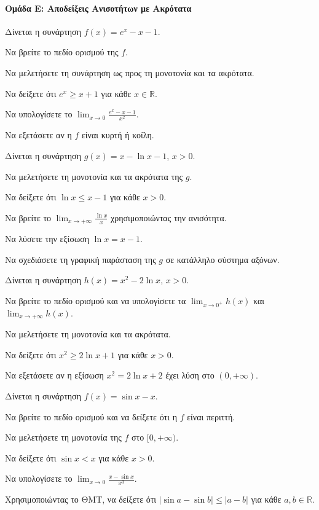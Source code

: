 \documentclass[11pt,a4paper,modern]{FFExercises}
\begin{document}
\paragraph{Ομάδα Ε: Αποδείξεις Ανισοτήτων με Ακρότατα}

\askhsh
Δίνεται η συνάρτηση $f(x) = e^x - x - 1$.
\begin{alist}
    \item Να βρείτε το πεδίο ορισμού της $f$.
    \item Να μελετήσετε τη συνάρτηση ως προς τη μονοτονία και τα ακρότατα.
    \item Να δείξετε ότι $e^x \ge x + 1$ για κάθε $x \in \mathbb{R}$.
    \item Να υπολογίσετε το $\displaystyle\lim_{x \to 0} \frac{e^x - x - 1}{x^2}$.
    \item Να εξετάσετε αν η $f$ είναι κυρτή ή κοίλη.
\end{alist}

\askhsh
Δίνεται η συνάρτηση $g(x) = x - \ln x - 1$, $x > 0$.
\begin{alist}
    \item Να μελετήσετε τη μονοτονία και τα ακρότατα της $g$.
    \item Να δείξετε ότι $\ln x \le x - 1$ για κάθε $x > 0$.
    \item Να βρείτε το $\displaystyle\lim_{x \to +\infty} \frac{\ln x}{x}$ χρησιμοποιώντας την ανισότητα.
    \item Να λύσετε την εξίσωση $\ln x = x - 1$.
    \item Να σχεδιάσετε τη γραφική παράσταση της $g$ σε κατάλληλο σύστημα αξόνων.
\end{alist}

\askhsh
Δίνεται η συνάρτηση $h(x) = x^2 - 2\ln x$, $x > 0$.
\begin{alist}
    \item Να βρείτε το πεδίο ορισμού και να υπολογίσετε τα $\displaystyle\lim_{x \to 0^+} h(x)$ και $\displaystyle\lim_{x \to +\infty} h(x)$.
    \item Να μελετήσετε τη μονοτονία και τα ακρότατα.
    \item Να δείξετε ότι $x^2 \ge 2\ln x + 1$ για κάθε $x > 0$.
    \item Να εξετάσετε αν η εξίσωση $x^2 = 2\ln x + 2$ έχει λύση στο $(0, +\infty)$.
\end{alist}

\askhsh
Δίνεται η συνάρτηση $f(x) = \sin x - x$.
\begin{alist}
    \item Να βρείτε το πεδίο ορισμού και να δείξετε ότι η $f$ είναι περιττή.
    \item Να μελετήσετε τη μονοτονία της $f$ στο $[0, +\infty)$.
    \item Να δείξετε ότι $\sin x < x$ για κάθε $x > 0$.
    \item Να υπολογίσετε το $\displaystyle\lim_{x \to 0} \frac{x - \sin x}{x^3}$.
    \item Χρησιμοποιώντας το ΘΜΤ, να δείξετε ότι $|\sin a - \sin b| \le |a - b|$ για κάθε $a, b \in \mathbb{R}$.
\end{alist}
\end{document}
